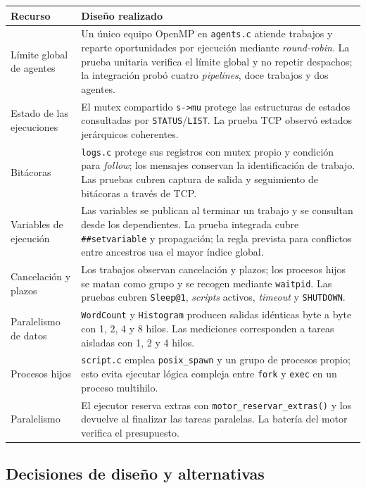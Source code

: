 \documentclass[12pt,a4paper]{article}
\newcommand{\code}[1]{\texttt{#1}}
\begin{document}
\begin{longtable}{@{}>{\raggedright\arraybackslash}p{3.6cm}>{\raggedright\arraybackslash}p{11.4cm}@{}}
\toprule
\textbf{Recurso} & \textbf{Diseño realizado} \\
\midrule
\endhead
Límite global de agentes &
Un único equipo OpenMP en \code{agents.c} atiende trabajos y reparte oportunidades por ejecución mediante \textit{round-robin}. La prueba unitaria verifica el límite global y no repetir despachos; la integración probó cuatro \textit{pipelines}, doce trabajos y dos agentes. \\[4pt]
Estado de las ejecuciones &
El mutex compartido \code{s->mu} protege las estructuras de estados consultadas por \code{STATUS}/\code{LIST}. La prueba TCP observó estados jerárquicos coherentes. \\[4pt]
Bitácoras &
\code{logs.c} protege sus registros con mutex propio y condición para \textit{follow}; los mensajes conservan la identificación de trabajo. Las pruebas cubren captura de salida y seguimiento de bitácoras a través de TCP. \\[4pt]
Variables de ejecución &
Las variables se publican al terminar un trabajo y se consultan desde los dependientes. La prueba integrada cubre \code{\#\#setvariable} y propagación; la regla prevista para conflictos entre ancestros usa el mayor índice global. \\[4pt]
Cancelación y plazos &
Los trabajos observan cancelación y plazos; los procesos hijos se matan como grupo y se recogen mediante \code{waitpid}. Las pruebas cubren \code{Sleep@1}, \textit{scripts} activos, \textit{timeout} y \code{SHUTDOWN}. \\[4pt]
Paralelismo de datos &
\code{WordCount} y \code{Histogram} producen salidas idénticas byte a byte con 1, 2, 4 y 8 hilos. Las mediciones corresponden a tareas aisladas con 1, 2 y 4 hilos. \\[4pt]
Procesos hijos &
\code{script.c} emplea \code{posix\_spawn} y un grupo de procesos propio; esto evita ejecutar lógica compleja entre \code{fork} y \code{exec} en un proceso multihilo. \\[4pt]
Paralelismo &
El ejecutor reserva extras con \code{motor\_reservar\_extras()} y los devuelve al finalizar las tareas paralelas. La batería del motor verifica el presupuesto. \\
\bottomrule
\end{longtable}

\subsection{Decisiones de diseño y alternativas}
\end{document}
